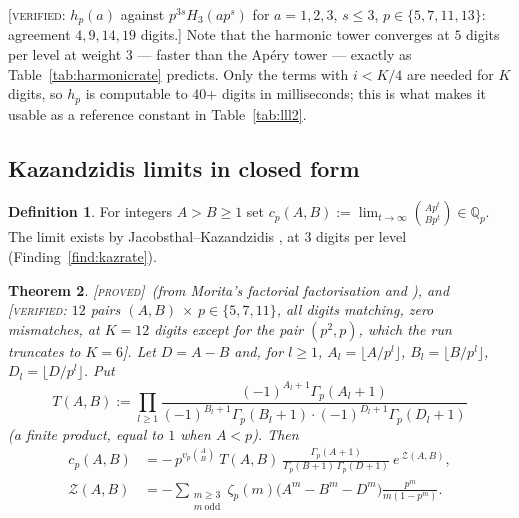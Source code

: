 \documentclass[11pt,reqno]{article}
\newcommand{\Qp}{\mathbb{Q}_p}
\newcommand{\Gp}{\Gamma_p}
\newcommand{\vp}{v_p}
\newcommand{\bin}[2]{\binom{#1}{#2}}
\newcommand{\floor}[1]{\lfloor #1 \rfloor}
\newcommand{\PROVED}{{\normalfont\textsc{[proved]}}}
\newcommand{\VER}[1]{{\normalfont\textsc{[verified:} #1\textsc{]}}}
\theoremstyle{plain}
\newtheorem{theorem}{Theorem}[section]
\theoremstyle{definition}
\newtheorem{definition}[theorem]{Definition}
\theoremstyle{remark}
\numberwithin{equation}{section}
\begin{document}
\VER{$h_p(a)$ against $p^{3s}H_3(ap^s)$ for $a=1,2,3$, $s\le3$,
$p\in\{5,7,11,13\}$: agreement $4,9,14,19$ digits.}  Note that the harmonic
tower converges at $5$ digits per level at weight $3$ --- faster than the Ap\'ery
tower --- exactly as Table~\ref{tab:harmonicrate} predicts.  Only the terms with
$i<K/4$ are needed for $K$ digits, so $h_p$ is computable to $40$+ digits in
milliseconds; this is what makes it usable as a reference constant in
Table~\ref{tab:lll2}.

\subsection{Kazandzidis limits in closed form}\label{ss:kaz}

\begin{definition}\label{def:kaz}
For integers $A>B\ge1$ set $c_p(A,B):=\lim_{t\to\infty}\bin{Ap^t}{Bp^t}\in\Qp$.
The limit exists by Jacobsthal--Kazandzidis \cite{JacobsthalKazandzidis}, at
$3$ digits per level (Finding~\ref{find:kazrate}).
\end{definition}

\begin{theorem}\label{thm:kaz}
\PROVED\ (from Morita's factorial factorisation and \cite[eq.~(2)]{BV2025}), and
\VER{$12$ pairs $(A,B)$ $\times$ $p\in\{5,7,11\}$, all digits matching, zero
mismatches, at $K=12$ digits except for the pair $(p^2,p)$, which the run
truncates to $K=6$}.
Let $D=A-B$ and, for $l\ge1$,
$A_l=\floor{A/p^l}$, $B_l=\floor{B/p^l}$, $D_l=\floor{D/p^l}$.  Put
\[
  T(A,B):=\prod_{l\ge1}
    \frac{(-1)^{A_l+1}\Gp(A_l+1)}
         {(-1)^{B_l+1}\Gp(B_l+1)\cdot(-1)^{D_l+1}\Gp(D_l+1)}
\]
(a finite product, equal to $1$ when $A<p$).  Then
\begin{equation}\label{eq:kaz}
\begin{aligned}
  c_p(A,B)
  &= -\,p^{\vp\binom{A}{B}}\ T(A,B)\
      \frac{\Gp(A+1)}{\Gp(B+1)\,\Gp(D+1)}\ e^{\,\mathcal{Z}(A,B)},\\[2pt]
  \mathcal{Z}(A,B)
  &= -\!\!\sum_{\substack{m\ge3\\ m\ \mathrm{odd}}}\!\!
        \zeta_p(m)\bigl(A^m-B^m-D^m\bigr)\frac{p^m}{m(1-p^m)}.
\end{aligned}
\end{equation}
\end{theorem}
\end{document}
